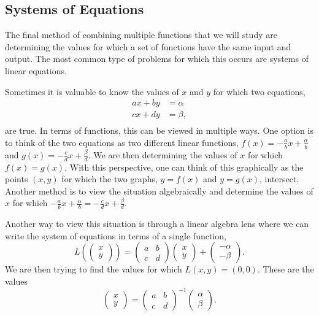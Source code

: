 \documentclass[
]{book}
\theoremstyle{definition}
\theoremstyle{definition}
\theoremstyle{definition}
\theoremstyle{definition}
\theoremstyle{remark}
\begin{document}
\hypertarget{systems-of-equations}{%
\subsection{Systems of Equations}\label{systems-of-equations}}

The final method of combining multiple functions that we will study are determining the values for which a set of functions have the same input and output. The most common type of problems for which this occurs are systems of linear equations.

Sometimes it is valuable to know the values of \(x\) and \(y\) for which two equations,
\begin{align*}
    ax+by &= \alpha \\
    c x + d y &= \beta, \\
\end{align*}
are true. In terms of functions, this can be viewed in multiple ways. One option is to think of the two equations as two different linear functions, \(f(x)=-\frac{a}{b} x + \frac{\alpha}{b}\) and \(g(x) = -\frac{c}{d} x + \frac{\beta}{d}\). We are then determining the values of \(x\) for which \(f(x)=g(x)\). With this perspective, one can think of this graphically as the points \((x,y)\) for which the two graphs, \(y=f(x)\) and \(y=g(x)\), intersect. Another method is to view the situation algebraically and determine the values of \(x\) for which \(-\frac{a}{b} x + \frac{\alpha}{b}=-\frac{c}{d} x + \frac{\beta}{d}\).

Another way to view this situation is through a linear algebra lens where we can write the system of equations in terms of a single function,
\[L\left( \begin{pmatrix} x \\ y \end{pmatrix} \right) = \begin{pmatrix} a & b \\ c & d \end{pmatrix} \begin{pmatrix} x \\ y \end{pmatrix} + \begin{pmatrix} -\alpha \\ - \beta \end{pmatrix}.\] We are then trying to find the values for which \(L(x,y) = (0,0)\). These are the values
\[\begin{pmatrix} x \\ y \end{pmatrix}= \begin{pmatrix} a & b \\ c & d \end{pmatrix}^{-1} \begin{pmatrix} \alpha \\ \beta \end{pmatrix}.\]
\end{document}
